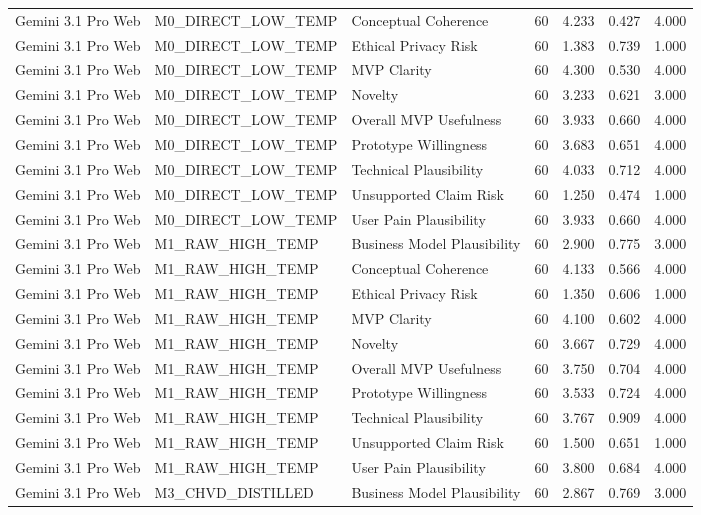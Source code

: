 \documentclass[10pt]{article}
\begin{document}
\begin{landscape}
\begin{longtable}{lllrrrr}
Gemini 3.1 Pro Web & M0\_DIRECT\_LOW\_TEMP & Conceptual Coherence & 60 & 4.233 & 0.427 & 4.000 \\
Gemini 3.1 Pro Web & M0\_DIRECT\_LOW\_TEMP & Ethical Privacy Risk & 60 & 1.383 & 0.739 & 1.000 \\
Gemini 3.1 Pro Web & M0\_DIRECT\_LOW\_TEMP & MVP Clarity & 60 & 4.300 & 0.530 & 4.000 \\
Gemini 3.1 Pro Web & M0\_DIRECT\_LOW\_TEMP & Novelty & 60 & 3.233 & 0.621 & 3.000 \\
Gemini 3.1 Pro Web & M0\_DIRECT\_LOW\_TEMP & Overall MVP Usefulness & 60 & 3.933 & 0.660 & 4.000 \\
Gemini 3.1 Pro Web & M0\_DIRECT\_LOW\_TEMP & Prototype Willingness & 60 & 3.683 & 0.651 & 4.000 \\
Gemini 3.1 Pro Web & M0\_DIRECT\_LOW\_TEMP & Technical Plausibility & 60 & 4.033 & 0.712 & 4.000 \\
Gemini 3.1 Pro Web & M0\_DIRECT\_LOW\_TEMP & Unsupported Claim Risk & 60 & 1.250 & 0.474 & 1.000 \\
Gemini 3.1 Pro Web & M0\_DIRECT\_LOW\_TEMP & User Pain Plausibility & 60 & 3.933 & 0.660 & 4.000 \\
Gemini 3.1 Pro Web & M1\_RAW\_HIGH\_TEMP & Business Model Plausibility & 60 & 2.900 & 0.775 & 3.000 \\
Gemini 3.1 Pro Web & M1\_RAW\_HIGH\_TEMP & Conceptual Coherence & 60 & 4.133 & 0.566 & 4.000 \\
Gemini 3.1 Pro Web & M1\_RAW\_HIGH\_TEMP & Ethical Privacy Risk & 60 & 1.350 & 0.606 & 1.000 \\
Gemini 3.1 Pro Web & M1\_RAW\_HIGH\_TEMP & MVP Clarity & 60 & 4.100 & 0.602 & 4.000 \\
Gemini 3.1 Pro Web & M1\_RAW\_HIGH\_TEMP & Novelty & 60 & 3.667 & 0.729 & 4.000 \\
Gemini 3.1 Pro Web & M1\_RAW\_HIGH\_TEMP & Overall MVP Usefulness & 60 & 3.750 & 0.704 & 4.000 \\
Gemini 3.1 Pro Web & M1\_RAW\_HIGH\_TEMP & Prototype Willingness & 60 & 3.533 & 0.724 & 4.000 \\
Gemini 3.1 Pro Web & M1\_RAW\_HIGH\_TEMP & Technical Plausibility & 60 & 3.767 & 0.909 & 4.000 \\
Gemini 3.1 Pro Web & M1\_RAW\_HIGH\_TEMP & Unsupported Claim Risk & 60 & 1.500 & 0.651 & 1.000 \\
Gemini 3.1 Pro Web & M1\_RAW\_HIGH\_TEMP & User Pain Plausibility & 60 & 3.800 & 0.684 & 4.000 \\
Gemini 3.1 Pro Web & M3\_CHVD\_DISTILLED & Business Model Plausibility & 60 & 2.867 & 0.769 & 3.000 \\

\end{longtable}
\end{landscape}
\end{document}
